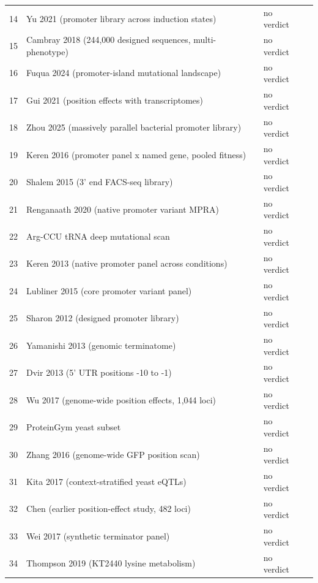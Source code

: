 \begin{longtable}{@{}r L{76mm} L{20mm} L{36mm} L{24mm}@{}}
14 & Yu 2021 (promoter library across induction states) &  & no verdict &  \\
15 & Cambray 2018 (244,000 designed sequences, multi-phenotype) &  & no verdict &  \\
16 & Fuqua 2024 (promoter-island mutational landscape) &  & no verdict &  \\
17 & Gui 2021 (position effects with transcriptomes) &  & no verdict &  \\
18 & Zhou 2025 (massively parallel bacterial promoter library) &  & no verdict &  \\
19 & Keren 2016 (promoter panel x named gene, pooled fitness) &  & no verdict &  \\
20 & Shalem 2015 (3' end FACS-seq library) &  & no verdict &  \\
21 & Renganaath 2020 (native promoter variant MPRA) &  & no verdict &  \\
22 & Arg-CCU tRNA deep mutational scan &  & no verdict &  \\
23 & Keren 2013 (native promoter panel across conditions) &  & no verdict &  \\
24 & Lubliner 2015 (core promoter variant panel) &  & no verdict &  \\
25 & Sharon 2012 (designed promoter library) &  & no verdict &  \\
26 & Yamanishi 2013 (genomic terminatome) &  & no verdict &  \\
27 & Dvir 2013 (5' UTR positions -10 to -1) &  & no verdict &  \\
28 & Wu 2017 (genome-wide position effects, 1,044 loci) &  & no verdict &  \\
29 & ProteinGym yeast subset &  & no verdict &  \\
30 & Zhang 2016 (genome-wide GFP position scan) &  & no verdict &  \\
31 & Kita 2017 (context-stratified yeast eQTLs) &  & no verdict &  \\
32 & Chen (earlier position-effect study, 482 loci) &  & no verdict &  \\
33 & Wei 2017 (synthetic terminator panel) &  & no verdict &  \\
34 & Thompson 2019 (KT2440 lysine metabolism) &  & no verdict &  \\

\end{longtable}
